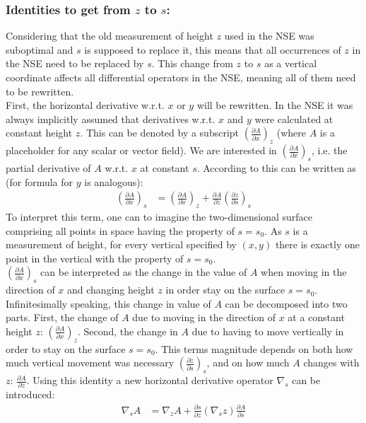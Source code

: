 \subsubsection*{Identities to get from $z$ to $s$:}
Considering that the old measurement of height $z$ used in the NSE was suboptimal and $s$ is supposed to replace it, this means that all occurrences of $z$ in the NSE need to be replaced by $s$.
This change from $z$ to $s$ as a vertical coordinate affects all differential operators in the NSE, meaning all of them need to be rewritten.
\\
First, the horizontal derivative w.r.t. $x$ or $y$ will be rewritten.
In the NSE it was always implicitly assumed that derivatives w.r.t. $x$ and $y$ were calculated at constant height $z$.
This can be denoted by a subscript $\left(\frac{\partial A}{\partial x}\right)_z$ (where $A$ is a placeholder for any scalar or vector field).
We are interested in $\left(\frac{\partial A}{\partial x}\right)_s$, i.e. the partial derivative of $A$ w.r.t. $x$ at constant $s$.
According to \cite{kasahara1974various} this can be written as (for formula for $y$ is analogous):
\begin{align*}
\left(\frac{\partial A}{\partial x}\right)_s &= \left( \frac{\partial A}{\partial x}\right)_z + \frac{\partial A}{\partial z}\left(\frac{\partial z}{\partial s}\right)_s
\end{align*}
To interpret this term, one can to imagine the two-dimensional surface comprising all points in space having the property of $s=s_0$.
As $s$ is a measurement of height, for every vertical specified by $(x,y)$ there is exactly one point in the vertical with the property of $s=s_0$.
\\
$\left(\frac{\partial A}{\partial x}\right)_s$ can be interpreted as the change in the value of $A$ when moving in the direction of $x$ and changing height $z$ in order stay on the surface $s=s_0$.
Infinitesimally speaking, this change in value of $A$ can be decomposed into two parts.
First, the change of $A$ due to moving in the direction of $x$ at a constant height $z$: $\left( \frac{\partial A}{\partial x}\right)_z$.
Second, the change in $A$ due to having to move vertically in order to stay on the surface $s=s_0$.
This terms magnitude depends on both how much vertical movement was necessary $\left(\frac{\partial z}{\partial s}\right)_s$, and on how much $A$ changes with $z$: $\frac{\partial A}{\partial z}$. 
Using this identity a new horizontal derivative operator $\nabla_s$ can be introduced:
\begin{align}
\nabla _s A &= \nabla _z A+\frac{\partial s}{\partial z}(\nabla _sz)\frac{\partial A}{\partial s}\label{id_h_diff}
\end{align}

